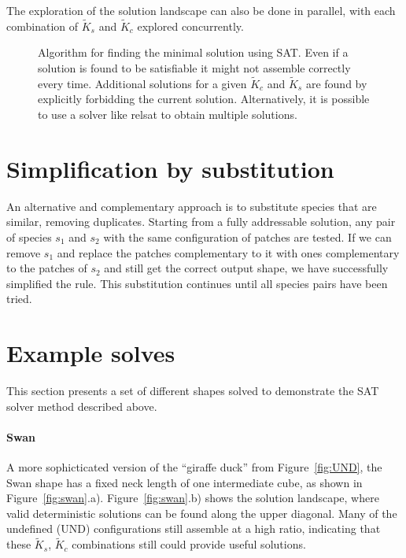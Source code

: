 The exploration of the solution landscape can also be done in parallel, with each combination of \(\widetilde{K}_s\) and \(\widetilde{K}_c\) explored concurrently.

\begin{figure}
    \centering
    \resizebox{\textwidth}{!}{}
    \caption{Algorithm for finding the minimal solution using SAT. Even if a solution is found to be satisfiable it might not assemble correctly every time. Additional solutions for a given \(\widetilde{K}_c\) and \(\widetilde{K}_s\) are found by explicitly forbidding the current solution. Alternatively, it is possible to use a solver like relsat to obtain multiple solutions. }
    \label{fig:sat_alg}
\end{figure}

\section{Simplification by substitution}
\label{sec:substitution_solving}
An alternative and complementary approach is to substitute species that are similar, removing duplicates. Starting from a fully addressable solution, any pair of species \(s_1\) and \(s_2\) with the same configuration of patches are tested. If we can remove \(s_1\) and replace the patches complementary to it with ones complementary to the patches of \(s_2\) and still get the correct output shape, we have successfully simplified the rule. This substitution continues until all species pairs have been tried.

\section{Example solves}
\label{sec:example_solves}
This section presents a set of different shapes solved to demonstrate the SAT solver method described above.

\paragraph{Swan} A more sophicticated version of the ``giraffe duck'' from Figure~\ref{fig:UND}, the Swan shape has a fixed neck length of one intermediate cube, as shown in Figure~\ref{fig:swan}.a). Figure~\ref{fig:swan}.b) shows the solution landscape, where valid deterministic solutions can be found along the upper diagonal. Many of the undefined (UND) configurations still assemble at a high ratio, indicating that these \(\widetilde{K}_s\), \(\widetilde{K}_c\) combinations still could provide useful solutions.

